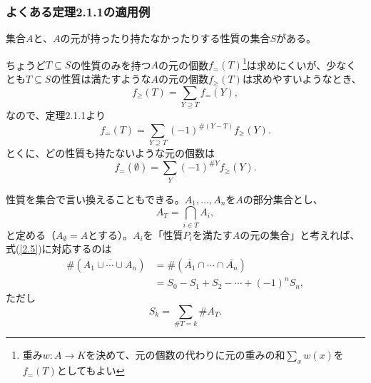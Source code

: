 \documentclass[xelatex,ja=standard,a4paper,14pt,everyparhook=compat]{bxjsarticle}
\theoremstyle{definition}
\begin{document}
\subsubsection*{よくある定理2.1.1の適用例}

集合$A$と、$A$の元が持ったり持たなかったりする性質の集合$S$がある。

ちょうど$T \subseteq S$の性質のみを持つ$A$の元の個数$f_=(T)$\footnote{重み$w:A \to K$を決めて、元の個数の代わりに元の重みの和$\sum_x w(x)$を$f_=(T)$としてもよい}は求めにくいが、少なくとも$T \subseteq S$の性質は満たすような$A$の元の個数$f_\geq(T)$は求めやすいようなとき、 \begin{equation*}
    f_\geq(T) = \sum_{Y \supseteq T} f_=(Y),
\end{equation*}
なので、定理2.1.1より \begin{equation*}
    f_=(T) = \sum_{Y \supseteq T} (-1)^{\#(Y-T)} f_\geq(Y).
\end{equation*}
とくに、どの性質も持たないような元の個数は \begin{equation} \label{2.5}
    f_=(\emptyset) = \sum_{Y} (-1)^{\#Y} f_\geq(Y).
\end{equation}

性質を集合で言い換えることもできる。$A_1,\ldots,A_n$を$A$の部分集合とし、 \begin{equation*}
    A_T = \bigcap_{i \in T} A_i,
\end{equation*}
と定める（$A_\emptyset = A$とする）。$A_i$を「性質$P_i$を満たす$A$の元の集合」と考えれば、式(\ref{2.5})に対応するのは \begin{align*}
    \#(\overline{A_1 \cup \cdots \cup A_n})
     & = \#(\overline{A_1} \cap \cdots \cap \overline{A_n}) \\
     & = S_0 - S_1 + S_2 - \cdots + (-1)^n S_n,
\end{align*}
ただし \begin{equation*}
    S_k = \sum_{\#T = k} \#A_T.
\end{equation*}
\end{document}
